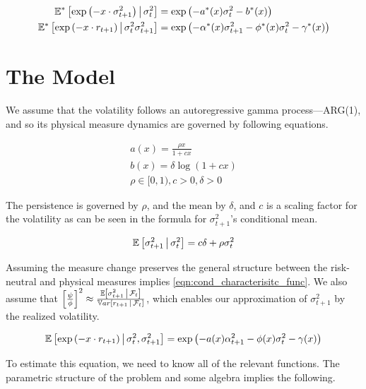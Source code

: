 \documentclass[11pt]{article}
\newcommand*{\F}{\mathcal{F}}
\newcommand*{\E}{\mathbb{E}}
\newcommand*{\Var}{\mathbb{V}ar}
\newcommand{\mvert}[1][\middle]{\ensuremath{\,#1\vert\,}}
\begin{document}
\begin{align}
    \E^{*}\left[\exp\left(-x \cdot \sigma^2_{t+1}\right) \mvert \sigma^2_t\right] &= \exp\left(-a^{*}(x)
    \sigma_t^2 - b^{*}(x)\right) \\
    \E^{*}\left[\exp\left(-x \cdot r_{t+1} \right)\mvert \sigma^2_t \sigma^2_{t+1}\right] &=
    \exp\left(-\alpha^{*}(x) \sigma^2_{t+1} - \phi^{*}(x) \sigma^2_t - \gamma^{*}(x)\right)
\end{align}


\section{The Model}


We assume that the volatility follows an autoregressive gamma process---ARG(1), and so its physical measure
dynamics are governed by following equations.

\begin{gather}
    a(x) = \frac{\rho x}{1 + c x}  \\
    b(x) = \delta \log \left(1 + c x\right) \\
    \rho \in [0, 1), c > 0, \delta > 0 
\end{gather}

The persistence is governed by $\rho$, and the mean by $\delta$, and $c$ is a scaling factor for the volatility as
can be seen in the formula for $\sigma^2_{t+1}$'s conditional mean.

\begin{equation}
    \E\left[\sigma^2_{t+1} \mvert \sigma^2_t\right] = c \delta + \rho \sigma^2_t
\end{equation}

Assuming the measure change preserves the general structure between the risk-neutral and physical measures implies
\cref{eqn:cond_characterisitc_func}.
We also assume that $\left[ \frac{\psi}{\phi} \right]^2 \approx \frac{\E \left[\sigma^2_{t+1} \mvert
\F_t\right]}{\Var\left[r_{t+1} \mvert \F_t\right]}$, which enables our approximation of $\sigma^2_{t+1}$ by the
realized volatility.

\begin{equation}
    \label{eqn:cond_characterisitc_func}
    \E\left[\exp\left(- x \cdot r_{t+1}\right) \mvert \sigma_t^2, \sigma^2_{t+1}\right] = \exp\left(- a(x)
    \alpha^2_{t+1} - \phi(x) \sigma^2_t - \gamma(x) \right) 
\end{equation}

To estimate this equation, we need to know all of the relevant functions.
The parametric structure of the problem and some algebra implies the following.
\end{document}
